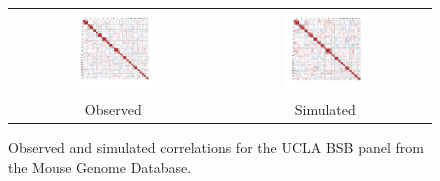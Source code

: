 \documentclass{article}
\newcommand{\ve}[1]{\mathbf{#1}}           %
\newcommand{\m}[1]{\mathbf{#1}}               %
\begin{document}
\begin{figure}[htp]
  \begin{center}
    \begin{tabular}{cc}
      \includegraphics[width = 0.400\textwidth]{./img/uclabsb.png} &
      \includegraphics[width = 0.400\textwidth]{./img/uclabsb_sim.png} \\
      {\footnotesize Observed} &
      {\footnotesize Simulated}
    \end{tabular}
  \end{center}
  \caption{Observed and simulated correlations for the UCLA BSB panel from the Mouse Genome Database.}
  \label{fig:uclabsb}
\end{figure}




\end{document}
